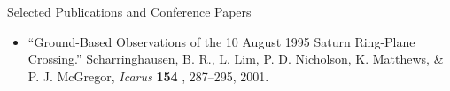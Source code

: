 \documentclass[11pt,oneside]{article}
\newenvironment{ressection}[1]{
	\vspace{4pt}
	{\Large#1}
	\begin{itemize}
	\vspace{3pt}
}{
	\end{itemize}
}
\newcommand{\resitem}[1]{
	\vspace{-4pt}
	\item \begin{flushleft} #1 \end{flushleft}
}
\newenvironment{reslist}[1]{
	\resitem{\textbf{#1}}
	\vspace{-5pt}
	\begin{itemize}
}{
	\end{itemize}
}
\begin{document}
\begin{ressection}{Selected Publications and Conference Papers}
\resitem{ ``Ground-Based Observations of the 10 August 1995 Saturn Ring-Plane 
Crossing.'' Scharringhausen, B. R., L. Lim, P. D. Nicholson, K. Matthews, 
\& P. J. McGregor,  {\it Icarus} {\bf 154 }, 287--295, 2001.  
}





\end{ressection}










\end{document}

